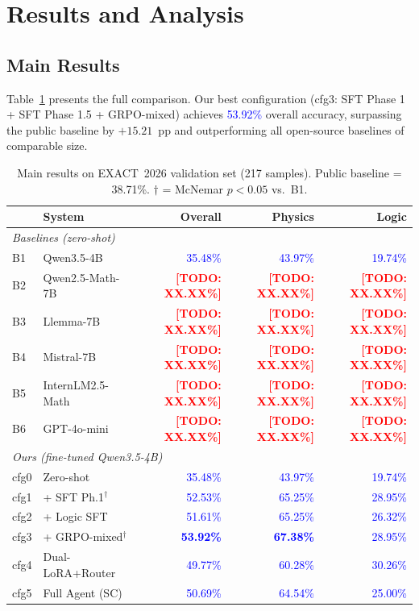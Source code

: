 \documentclass{ieeeaccess}
\newcommand{\todo}[1]{\textcolor{red}{\textbf{[TODO: #1]}}}
\newcommand{\fill}[1]{\textcolor{blue}{#1}}  %
\newcommand{\basemodelname}{Qwen3.5-4B}
\newcommand{\dataset}{EXACT~2026}
\begin{document}
\section{Results and Analysis}
\label{sec:results}

\subsection{Main Results}

Table~\ref{tab:main} presents the full comparison.
Our best configuration (cfg3: SFT Phase 1 + SFT Phase 1.5 + GRPO-mixed)
achieves \fill{53.92\%} overall accuracy, surpassing the public baseline
by $+15.21$~pp and outperforming all open-source baselines of comparable size.

\begin{table}[t]
  \centering
  \caption{Main results on \dataset{} validation set (217 samples).
           Public baseline = 38.71\%.
           $\dagger$ = McNemar $p < 0.05$ vs.\ B1.}
  \label{tab:main}
  \begin{tabular}{llrrr}
    \toprule
    & \textbf{System} & \textbf{Overall} & \textbf{Physics} & \textbf{Logic} \\
    \midrule
    \multicolumn{5}{l}{\textit{Baselines (zero-shot)}} \\
    B1 & \basemodelname{} & \fill{35.48\%} & \fill{43.97\%} & \fill{19.74\%} \\
    B2 & Qwen2.5-Math-7B  & \todo{XX.XX\%} & \todo{XX.XX\%} & \todo{XX.XX\%} \\
    B3 & Llemma-7B        & \todo{XX.XX\%} & \todo{XX.XX\%} & \todo{XX.XX\%} \\
    B4 & Mistral-7B       & \todo{XX.XX\%} & \todo{XX.XX\%} & \todo{XX.XX\%} \\
    B5 & InternLM2.5-Math & \todo{XX.XX\%} & \todo{XX.XX\%} & \todo{XX.XX\%} \\
    B6 & GPT-4o-mini      & \todo{XX.XX\%} & \todo{XX.XX\%} & \todo{XX.XX\%} \\
    \midrule
    \multicolumn{5}{l}{\textit{Ours (fine-tuned \basemodelname{})}} \\
    cfg0 & Zero-shot      & \fill{35.48\%} & \fill{43.97\%} & \fill{19.74\%} \\
    cfg1 & + SFT Ph.1$^\dagger$ & \fill{52.53\%} & \fill{65.25\%} & \fill{28.95\%} \\
    cfg2 & + Logic SFT    & \fill{51.61\%} & \fill{65.25\%} & \fill{26.32\%} \\
    cfg3 & + GRPO-mixed$^\dagger$ & \textbf{\fill{53.92\%}} & \textbf{\fill{67.38\%}} & \fill{28.95\%} \\
    cfg4 & Dual-LoRA+Router & \fill{49.77\%} & \fill{60.28\%} & \fill{30.26\%} \\
    cfg5 & Full Agent (SC) & \fill{50.69\%} & \fill{64.54\%} & \fill{25.00\%} \\
    \bottomrule
  \end{tabular}
\end{table}
\end{document}
